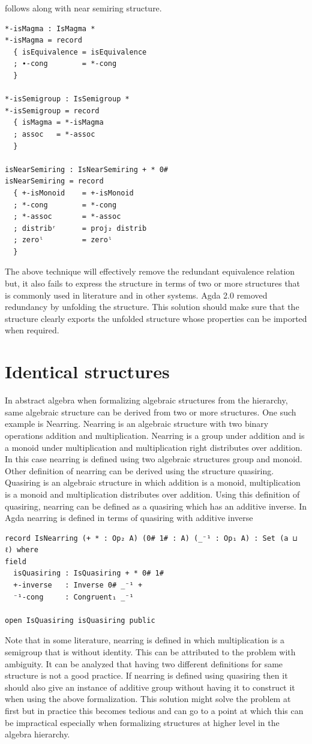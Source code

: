 follows along with near semiring structure.
\begin{verbatim}
*-isMagma : IsMagma *
*-isMagma = record
  { isEquivalence = isEquivalence
  ; ∙-cong        = *-cong
  }

*-isSemigroup : IsSemigroup *
*-isSemigroup = record
  { isMagma = *-isMagma
  ; assoc   = *-assoc
  }

isNearSemiring : IsNearSemiring + * 0#
isNearSemiring = record
  { +-isMonoid    = +-isMonoid
  ; *-cong        = *-cong
  ; *-assoc       = *-assoc
  ; distribʳ      = proj₂ distrib
  ; zeroˡ         = zeroˡ
  }
\end{verbatim}
The above technique will effectively remove the redundant equivalence relation
but, it also fails to express the structure in terms of two or more structures
that is commonly used in literature and in other systems. Agda 2.0 removed
redundancy by unfolding the structure. This solution should make sure that the
structure clearly exports the unfolded structure whose properties can be
imported when required.

\section{Identical structures}
In abstract algebra when formalizing algebraic structures from the hierarchy,
same algebraic structure can be derived from two or more structures. One such
example is Nearring. Nearring is an algebraic structure with two binary
operations addition and multiplication. Nearring is a group under addition and
is a monoid under multiplication and multiplication right distributes over
addition. In this case nearring is defined using two algebraic structures group
and monoid. Other definition of nearring can be derived using the structure
quasiring. Quasiring is an algebraic structure in which addition is a monoid,
multiplication is a monoid and multiplication distributes over addition. Using
this definition of quasiring, nearring can be defined as a quasiring which has
an additive inverse. In Agda nearring is defined in terms of quasiring with
additive inverse 
\begin{verbatim}
record IsNearring (+ * : Op₂ A) (0# 1# : A) (_⁻¹ : Op₁ A) : Set (a ⊔ ℓ) where
field
  isQuasiring : IsQuasiring + * 0# 1#
  +-inverse   : Inverse 0# _⁻¹ +
  ⁻¹-cong     : Congruent₁ _⁻¹

open IsQuasiring isQuasiring public
\end{verbatim}
Note that in some literature, nearring is defined in which multiplication is a
semigroup that is without identity. This can be attributed to the problem with
ambiguity. It can be analyzed that having two different definitions for same
structure is not a good practice. If nearring is defined using quasiring then
it should also give an instance of additive group without having it to construct
it when using the above formalization. This solution might solve the problem at
first but in practice this becomes tedious and can go to a point at which this
can be impractical especially when formalizing structures at higher level in the
algebra hierarchy.

